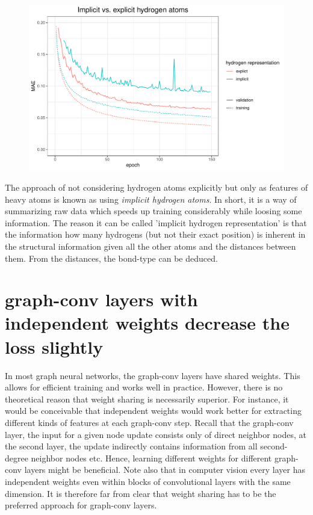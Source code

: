 \begin{figure}[H]
	\includegraphics[width=\linewidth]{figures/implict-hydrogens.pdf}
	
	\caption{}
	\label{fig:implicit-hydrogens}
\end{figure}


The approach of not considering hydrogen atoms explicitly but only as features of heavy atoms is known as using \textit{implicit hydrogen atoms}. In short, it is a way of summarizing raw data which speeds up training considerably while loosing some information. The reason it can be called 'implicit hydrogen representation' is that the information how many hydrogens (but not their exact position) is inherent in the structural information given all the other atoms and the distances between them. From the distances, the bond-type can be deduced. 




\section{graph-conv layers with independent weights decrease the loss slightly}


In most graph neural networks, the graph-conv layers have shared weights. This allows for efficient training and works well in practice. However, there is no theoretical reason that weight sharing is necessarily superior. For instance, it would be conceivable that independent weights would work better for extracting different kinds of features at each graph-conv step. Recall that the graph-conv layer, the input for a given node update consists only of direct neighbor nodes, at the second layer, the update indirectly contains information from all second-degree neighbor nodes etc. Hence, learning different weights for different graph-conv layers might be beneficial. Note also that in computer vision every layer has independent weights even within blocks of convolutional layers with the same dimension. It is therefore far from clear that weight sharing has to be the preferred approach for graph-conv layers.

